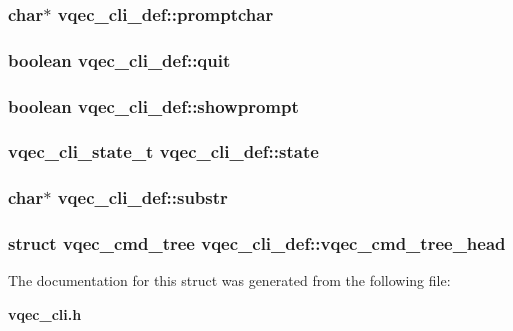 \subsubsection{\setlength{\rightskip}{0pt plus 5cm}char$\ast$ \bf{vqec\_\-cli\_\-def::promptchar}}\label{structvqec__cli__def_6f044722283f4dafcc84f3608d22c4ea}


\subsubsection{\setlength{\rightskip}{0pt plus 5cm}boolean \bf{vqec\_\-cli\_\-def::quit}}\label{structvqec__cli__def_b7f0176e513dd20922f1c7be161b42c6}


\subsubsection{\setlength{\rightskip}{0pt plus 5cm}boolean \bf{vqec\_\-cli\_\-def::showprompt}}\label{structvqec__cli__def_5aa1f54027f4495b4a580f5143af4fe9}


\subsubsection{\setlength{\rightskip}{0pt plus 5cm}\bf{vqec\_\-cli\_\-state\_\-t} \bf{vqec\_\-cli\_\-def::state}}\label{structvqec__cli__def_ecc2deb293e747eef4f440bbc731ab33}


\subsubsection{\setlength{\rightskip}{0pt plus 5cm}char$\ast$ \bf{vqec\_\-cli\_\-def::substr}}\label{structvqec__cli__def_c915976acf3ce3f1c840f4a670eb6f1e}


\subsubsection{\setlength{\rightskip}{0pt plus 5cm}struct vqec\_\-cmd\_\-tree \bf{vqec\_\-cli\_\-def::vqec\_\-cmd\_\-tree\_\-head}}\label{structvqec__cli__def_4c9b0a86c587ff110012df6f29889f2a}




The documentation for this struct was generated from the following file:\begin{CompactItemize}
\item 
\bf{vqec\_\-cli.h}\end{CompactItemize}

